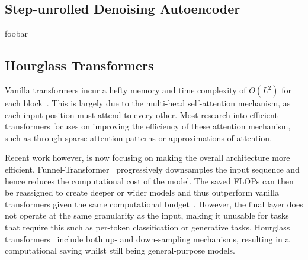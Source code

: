 \subsection{Step-unrolled Denoising Autoencoder}
\label{subsec:sundae}
foobar

\subsection{Hourglass Transformers}
\label{subsec:hourglass}

Vanilla transformers incur a hefty memory and time complexity of $O(L^2)$ for
each block~\cite{vaswani2017attention}. This is largely due to the multi-head
self-attention mechanism, as each input position must attend to every other.
Most research into efficient transformers focuses on improving the efficiency of
these attention mechanism, such as through sparse attention patterns or
approximations of attention.

Recent work however, is now focusing on making the overall architecture more
efficient. Funnel-Transformer~\cite{dai2020funneltransformer} progressively
downsamples the input sequence and hence reduces the computational cost of the
model. The saved FLOPs can then be reassigned to create deeper or wider models
and thus outperform vanilla transformers given the same computational
budget~\cite{dai2020funneltransformer}. However, the final layer does not
operate at the same granularity as the input, making it unusable for tasks that
require this such as per-token classification or generative tasks. Hourglass
transformers~\cite{nawrot2021hierarchical} include both up- and down-sampling
mechanisms, resulting in a computational saving whilst still being
general-purpose models.
